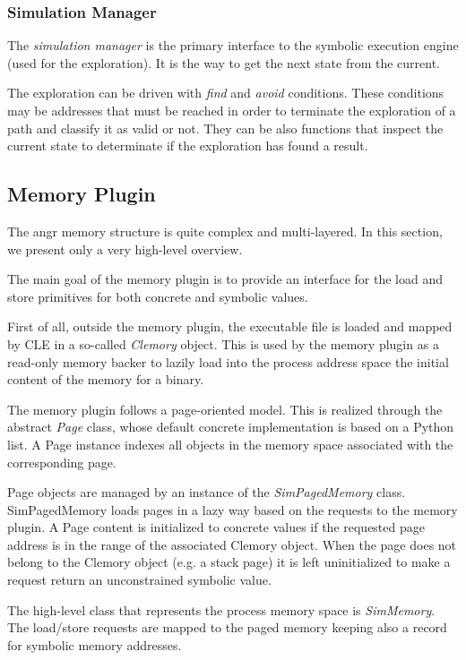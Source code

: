 \subsubsection{Simulation Manager}

The {\em simulation manager} is the primary interface to the symbolic execution engine (used for the exploration). It is the way to get the next state from the current.

The exploration can be driven with {\em find} and {\em avoid} conditions. These conditions may be addresses that must be reached in order to terminate the exploration of a path and classify it as valid or not.
They can be also functions that inspect the current state to determinate if the exploration has found a result.

\subsection{Memory Plugin}

The angr memory structure is quite complex and multi-layered. In this section, we present only a very high-level overview. 

The main goal of the memory plugin is to provide an interface for the load and store primitives for both concrete and symbolic values.

First of all, outside the memory plugin, the executable file is loaded and mapped by CLE in a so-called {\em Clemory} object. This is used by the memory plugin as a read-only memory backer to lazily load into the process address space the initial content of the memory for a binary.

The memory plugin follows a page-oriented model.
This is realized through the abstract {\em Page} class, whose default concrete implementation is based on a Python list. A Page instance indexes all objects in the memory space associated with the corresponding page.

Page objects are managed by an instance of the {\em SimPagedMemory} class.
SimPagedMemory loads pages in a lazy way based on the requests to the memory plugin. A Page content is initialized to concrete values if the requested page address is in the range of the associated Clemory object. When the page does not belong to the Clemory object (e.g. a stack page) it is left uninitialized to make a request return an unconstrained symbolic value.

The high-level class that represents the process memory space is {\em SimMemory}. The load/store requests are mapped to the paged memory keeping also a record for symbolic memory addresses. 

